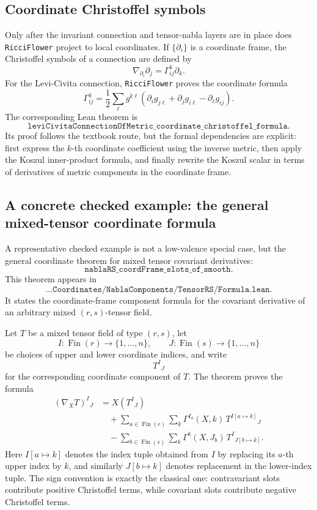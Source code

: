 \documentclass[11pt]{article}
\theoremstyle{plain}
\theoremstyle{definition}
\theoremstyle{remark}
\begin{document}
\subsection{Coordinate Christoffel symbols}

Only after the invariant connection and tensor-nabla layers are in place does
\texttt{RicciFlower} project to local coordinates.  If $\{\partial_i\}$ is a
coordinate frame, the Christoffel symbols of a connection are defined by
\[
  \nabla_{\partial_i}\partial_j
  =
  \Gamma^k_{ij}\partial_k.
\]
For the Levi-Civita connection, \texttt{RicciFlower} proves the coordinate
formula
\[
  \Gamma^k_{ij}
  =
  \frac12
  \sum_\ell g^{k\ell}
  \left(
    \partial_i g_{j\ell}
    +
    \partial_j g_{i\ell}
    -
    \partial_\ell g_{ij}
  \right).
\]
The corresponding Lean theorem is
\[
  \texttt{leviCivitaConnectionOfMetric\_coordinate\_christoffel\_formula}.
\]
Its proof follows the textbook route, but the formal dependencies are explicit:
first express the $k$-th coordinate coefficient using the inverse metric, then
apply the Koszul inner-product formula, and finally rewrite the Koszul scalar in
terms of derivatives of metric components in the coordinate frame.

\subsection{A concrete checked example: the general mixed-tensor coordinate formula}

A representative checked example is not a low-valence special case, but the
general coordinate theorem for mixed tensor covariant derivatives:
\[
  \texttt{nablaRS\_coordFrame\_slots\_of\_smooth}.
\]
This theorem appears in
\[
  \texttt{...Coordinates/NablaComponents/TensorRS/Formula.lean}.
\]
It states the coordinate-frame component formula for the covariant derivative of
an arbitrary mixed $(r,s)$-tensor field.

Let $T$ be a mixed tensor field of type $(r,s)$, let
\[
  I : \operatorname{Fin}(r) \to \{1,\ldots,n\},
  \qquad
  J : \operatorname{Fin}(s) \to \{1,\ldots,n\}
\]
be choices of upper and lower coordinate indices, and write
\[
  T^I{}_J
\]
for the corresponding coordinate component of $T$.  The theorem proves the
formula
\[
\begin{aligned}
  (\nabla_X T)^I{}_J
  &=
  X(T^I{}_J)                                                     \\
  &\quad
  +
  \sum_{a\in \operatorname{Fin}(r)}
  \sum_k
  \Gamma^{I_a}(X,k)\,
  T^{I[a\mapsto k]}{}_J                                      \\
  &\quad
  -
  \sum_{b\in \operatorname{Fin}(s)}
  \sum_k
  \Gamma^k(X,J_b)\,
  T^I{}_{J[b\mapsto k]} .
\end{aligned}
\]
Here $I[a\mapsto k]$ denotes the index tuple obtained from $I$ by replacing its
$a$-th upper index by $k$, and similarly $J[b\mapsto k]$ denotes replacement in
the lower-index tuple.  The sign convention is exactly the classical one:
contravariant slots contribute positive Christoffel terms, while covariant slots
contribute negative Christoffel terms.
\end{document}
